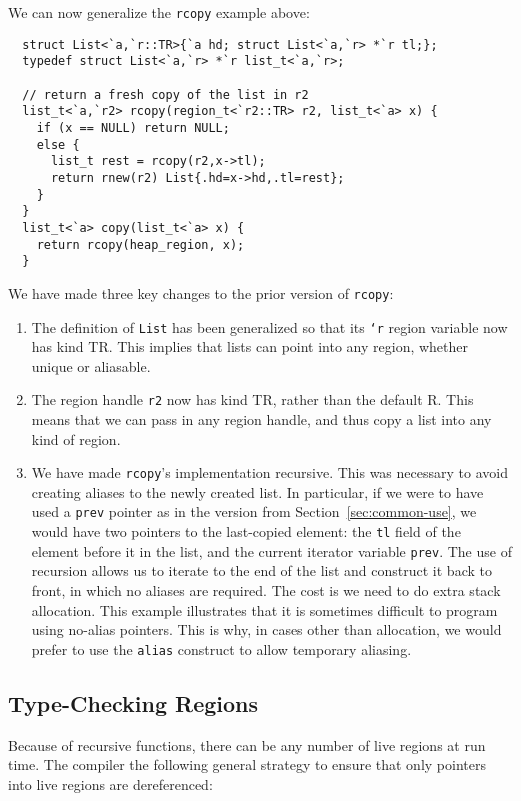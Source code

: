 We can now generalize the \texttt{rcopy} example above:
\begin{verbatim}
  struct List<`a,`r::TR>{`a hd; struct List<`a,`r> *`r tl;};
  typedef struct List<`a,`r> *`r list_t<`a,`r>;

  // return a fresh copy of the list in r2
  list_t<`a,`r2> rcopy(region_t<`r2::TR> r2, list_t<`a> x) {
    if (x == NULL) return NULL;
    else {
      list_t rest = rcopy(r2,x->tl);
      return rnew(r2) List{.hd=x->hd,.tl=rest};
    }
  }
  list_t<`a> copy(list_t<`a> x) {
    return rcopy(heap_region, x);
  }
\end{verbatim}
We have made three key changes to the prior version of \texttt{rcopy}:
\begin{enumerate}
\item The definition of \texttt{List} has been generalized so that its
  \texttt{`r} region variable now has kind TR.  This implies that lists can
  point into any region, whether unique or aliasable.
\item The region handle \texttt{r2} now has kind TR, rather than the default
  R.  This means that we can pass in any region handle, and thus copy a list
  into any kind of region.
\item We have made \texttt{rcopy}'s implementation recursive.  This was
  necessary to avoid creating aliases to the newly created list.  In
  particular, if we were to have used a \texttt{prev} pointer as in the
  version from Section~\ref{sec:common-use}, we would have two pointers to
  the last-copied element: the \texttt{tl} field of the element before it in
  the list, and the current iterator variable \texttt{prev}.  The use of
  recursion allows us to iterate to the end of the list and construct it
  back to front, in which no aliases are required.  The cost is we need to
  do extra stack allocation.  This example illustrates that it is sometimes
  difficult to program using no-alias pointers.  This is why, in cases other
  than allocation, we would prefer to use the \texttt{alias} construct to
  allow temporary aliasing.
\end{enumerate}

\subsection{Type-Checking Regions}

Because of recursive functions, there can be any number of live
regions at run time.  The compiler the following general strategy to
ensure that only pointers into live regions are dereferenced:

